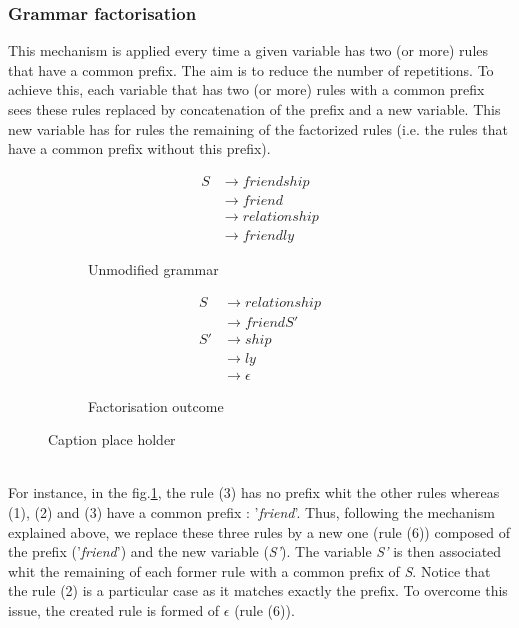 \documentclass[a4paper,11pt]{article}
\begin{document}
    \subsubsection{Grammar factorisation}
      This mechanism is applied every time a given variable has two (or more) rules that have a common prefix. The aim is to reduce the number of repetitions. To achieve this, each variable that has two (or more) rules with a common prefix sees these rules replaced by concatenation of the prefix and a new variable. This new variable has for rules the remaining of the factorized rules (i.e. the rules that have a common prefix without this prefix).
      \begin{figure}[h!]
          \centering
          \begin{subfigure}[b]{0.4\textwidth}
              \centering
              \begin{align}
                S &\rightarrow friendship \\
                  &\rightarrow friend \\
                  &\rightarrow relationship \\
                  &\rightarrow friendly
              \end{align}
              \caption{Unmodified grammar}
              \label{fig:unmodifiedgrammar1}
          \end{subfigure}%
          \begin{subfigure}[b]{0.4\textwidth}
              \centering
              \begin{align}
                S  &\rightarrow relationship \\
                   &\rightarrow friendS' \\
                S' &\rightarrow ship \\
                   &\rightarrow ly \\
                   &\rightarrow \epsilon
              \end{align}
              \caption{Factorisation outcome}
              \label{fig:resultinggrammar1}
          \end{subfigure}
          \caption{Caption place holder}
      \end{figure}\\
      For instance, in the fig.\ref{fig:unmodifiedgrammar1}, the rule (3) has no prefix whit the other rules whereas (1), (2) and (3) have a common prefix : '\textit{friend}'. Thus, following the mechanism explained above, we replace these three rules by a new one (rule (6)) composed of the prefix ('\textit{friend}') and the new variable (\textit{S'}). The variable \textit{S'} is then associated whit the remaining of each former rule with a common prefix of \textit{S}. Notice that the rule (2) is a particular case as it matches exactly the prefix. To overcome this issue, the created rule is formed of $\epsilon$ (rule (6)).\\\\
\end{document}
